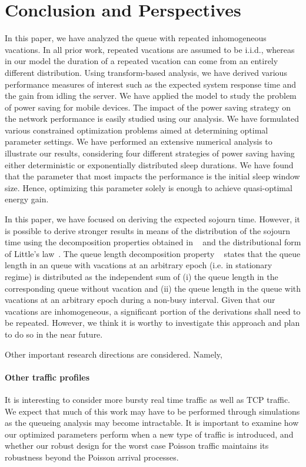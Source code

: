 \documentclass[journal]{IEEEtran}
\begin{document}
\section{Conclusion and Perspectives}
\label{s:conc}
In this paper, we have analyzed the  queue with repeated inhomogeneous vacations. In all prior work, repeated vacations are assumed to be i.i.d., whereas in our model the duration of a repeated vacation can come from an entirely different distribution. Using transform-based analysis, we have derived various performance measures of interest such as the expected system response time and the gain from idling the server. We have applied the model to study the problem of power saving for mobile devices. The impact of the power saving strategy on the network performance is easily studied using our analysis. We have formulated various constrained optimization problems aimed at determining optimal parameter settings. We have performed an extensive numerical analysis to illustrate our results, considering four different strategies of power saving having either deterministic or exponentially distributed sleep durations. We have found that the parameter that most impacts the performance is the initial sleep window size. Hence, optimizing this parameter solely is enough to achieve quasi-optimal energy gain.

In this paper, we have focused on deriving the expected sojourn time. However, it is possible to derive stronger results in means of the distribution of the sojourn time using the decomposition properties obtained in ~\cite{Fuhrmann_Copper_1985} and the distributional form of Little's law~\cite{KS83}. The queue length decomposition property ~\cite{Fuhrmann_Copper_1985} states that the queue length in an  queue with vacations at an arbitrary epoch (i.e. in stationary regime) is distributed as the independent sum of (i) the queue length in the corresponding  queue without vacation and (ii) the queue length in the  queue with vacations at an arbitrary epoch during a non-busy interval. Given that our vacations are inhomogeneous, a significant portion of the derivations shall need to be repeated. However, we think it is worthy to investigate this approach and plan to do so in the near future. 

Other important research directions are considered. Namely,
\paragraph{Other traffic profiles}
It is interesting to consider more bursty real time traffic as well as TCP traffic. We expect that much of this work may have to be performed through simulations as the queueing analysis may become intractable. It is important to examine how our optimized parameters perform when a new type of traffic is introduced, and whether our robust design for the worst case Poisson traffic maintains its robustness beyond the Poisson arrival processes.
\end{document}
